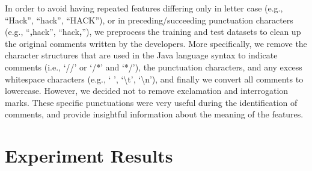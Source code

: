 In order to avoid having repeated features differing only in letter case (e.g., ``Hack'', ``hack'', ``HACK''), or in preceding/succeeding punctuation characters (e.g., ``\textbf{,}hack'', ``hack\textbf{,}''), we preprocess the training and test datasets to clean up the original comments written by the developers. More specifically, we remove the character structures that are used in the Java language syntax to indicate comments (i.e., `//' or `/*' and `*/'), the punctuation characters, and any excess whitespace characters (e.g., ` ', `\textbackslash t', `\textbackslash n'), and finally we convert all comments to lowercase. However, we decided not to remove exclamation and interrogation marks. These specific punctuations were very useful during the identification of \SATD comments, and provide insightful information about the meaning of the features.

\section{Experiment Results}
\label{chap4:experiment_results}

